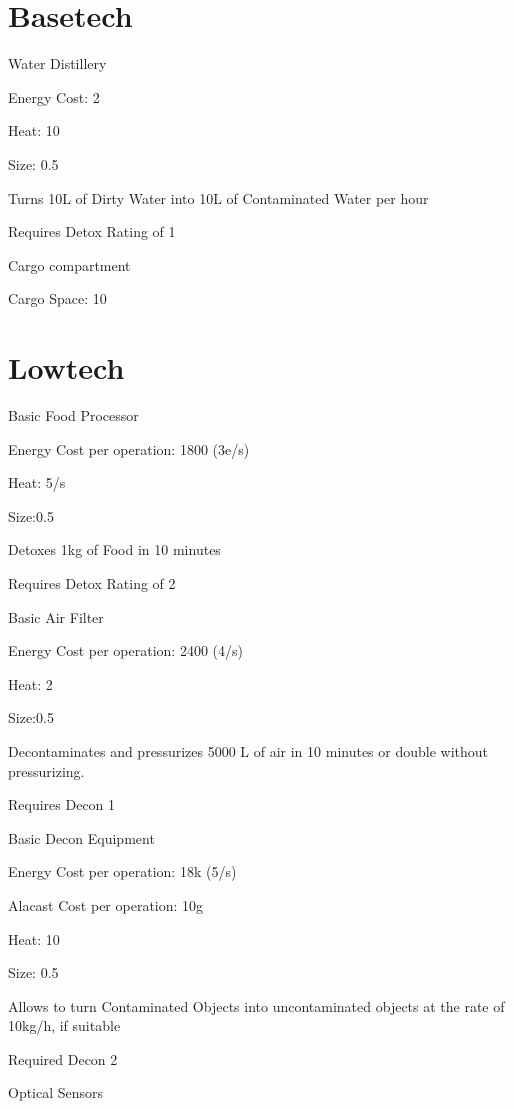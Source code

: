 \section{Basetech}\label{sec:basetech}
Water Distillery \par
Energy Cost: 2\par
Heat: 10\par
Size: 0.5\par
Turns 10L of Dirty Water into 10L of Contaminated Water per hour\par
Requires Detox Rating of 1\par
\par
Cargo compartment\par
Cargo Space: 10 \par
\par
\section{Lowtech}\label{sec:lowtech}
Basic Food Processor\par
Energy Cost per operation: 1800 (3e/s)\par
Heat: 5/s \par
Size:0.5\par
Detoxes 1kg of Food in 10 minutes \par
Requires Detox Rating of 2\par
\par
Basic Air Filter\par
Energy Cost per operation: 2400 (4/s)\par
Heat: 2\par
Size:0.5\par
Decontaminates and pressurizes 5000 L of air in  10 minutes or double without pressurizing. \par
Requires Decon 1\par
\par
Basic Decon Equipment \par
Energy Cost per operation: 18k (5/s)\par
Alacast Cost per operation: 10g\par
Heat: 10 \par
Size: 0.5\par
Allows to turn Contaminated Objects into uncontaminated objects at the rate of 10kg/h, if suitable\par
Required Decon 2\par
\par
Optical Sensors\par
